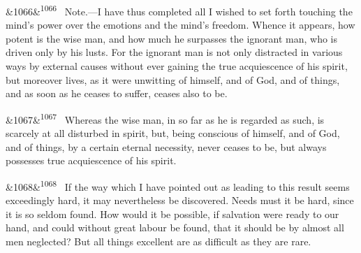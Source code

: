 \documentclass[12pt]{article}
\newcommand{\para}[1][]{\par\noindent\ifx&#1&\else\textsuperscript{\footnotesize #1}~\fi}
\begin{document}
\para[1066] Note.---I have thus completed all I wished to set forth touching the mind's power over the emotions and the mind's freedom. Whence it appears, how potent is the wise man, and how much he surpasses the ignorant man, who is driven only by his lusts. For the ignorant man is not only distracted in various ways by external causes without ever gaining the true acquiescence of his spirit, but moreover lives, as it were unwitting of himself, and of God, and of things, and as soon as he ceases to suffer, ceases also to be.

\para[1067] Whereas the wise man, in so far as he is regarded as such, is scarcely at all disturbed in spirit, but, being conscious of himself, and of God, and of things, by a certain eternal necessity, never ceases to be, but always possesses true acquiescence of his spirit.

\para[1068] If the way which I have pointed out as leading to this result seems exceedingly hard, it may nevertheless be discovered. Needs must it be hard, since it is so seldom found. How would it be possible, if salvation were ready to our hand, and could without great labour be found, that it should be by almost all men neglected? But all things excellent are as difficult as they are rare.

\end{document}
